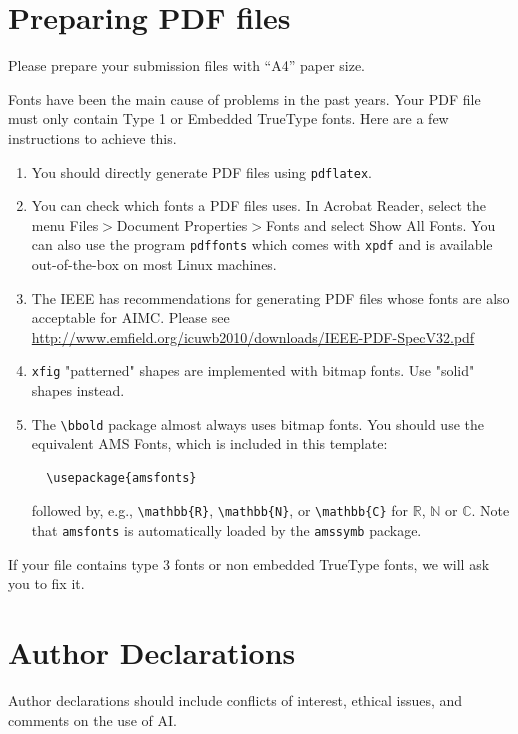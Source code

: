 \documentclass{aimc2026}
\begin{document}
\section{Preparing PDF files}
\label{sec:pdf_files}

Please prepare your submission files with ``A4'' paper size.

Fonts have been the main cause of problems in the past years. Your PDF file must only contain Type 1 or Embedded TrueType fonts. Here are a few instructions to achieve this.

\begin{enumerate}
  \item You should directly generate PDF files using \texttt{pdflatex}.
  \item You can check which fonts a PDF files uses.  In Acrobat Reader, select the
    menu Files$>$Document Properties$>$Fonts and select Show All Fonts. You can
    also use the program \texttt{pdffonts} which comes with \texttt{xpdf} and is
    available out-of-the-box on most Linux machines.
  \item The IEEE has recommendations for generating PDF files whose fonts are also
    acceptable for AIMC. Please see
    \url{http://www.emfield.org/icuwb2010/downloads/IEEE-PDF-SpecV32.pdf}

  \item \texttt{xfig} "patterned" shapes are implemented with bitmap fonts.  Use
    "solid" shapes instead.
  \item The \texttt{\textbackslash bbold} package almost always uses bitmap fonts.  You should use
    the equivalent AMS Fonts, which is included in this template:
\begin{verbatim}
  \usepackage{amsfonts}
\end{verbatim}
    followed by, e.g., \texttt{\textbackslash mathbb\{R\}}, \texttt{\textbackslash mathbb\{N\}}, or \texttt{\textbackslash mathbb\{C\}}
    for $\mathbb{R}$, $\mathbb{N}$ or $\mathbb{C}$.
    Note that \texttt{amsfonts} is automatically loaded by the \texttt{amssymb} package.
\end{enumerate}

If your file contains type 3 fonts or non embedded TrueType fonts, we will ask
you to fix it.


\section*{Author Declarations}

Author declarations should include conflicts of interest, ethical issues, and comments on the use of AI.
\end{document}
